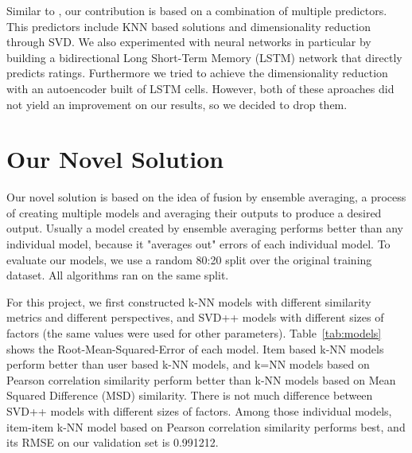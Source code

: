 \documentclass[10pt,conference,compsocconf]{IEEEtran}
\newcommand{\rtab}[1]{Table~\ref{tab:#1}}
\begin{document}
Similar to \cite{paterek}, our contribution is based on a combination of multiple predictors. This predictors include KNN based solutions and dimensionality reduction through SVD. We also experimented with neural networks in particular by building a bidirectional Long Short-Term Memory (LSTM) network that directly predicts ratings. Furthermore we tried to achieve the dimensionality reduction with an autoencoder built of LSTM cells. However, both of these aproaches did not yield an improvement on our results, so we decided to drop them.

\section{Our Novel Solution}
Our novel solution is based on the idea of fusion by ensemble averaging, a process of creating multiple models and averaging their outputs to produce a desired output\cite{ariel}. Usually a model created by ensemble averaging performs better than any individual model, because it "averages out" errors of each individual model. To evaluate our models, we use a random 80:20 split over the original training dataset. All algorithms ran on the same split. 

For this project, we first constructed k-NN models with different similarity metrics and different perspectives, and SVD++ models with different sizes of factors (the same values were used for other parameters). \rtab{models} shows the Root-Mean-Squared-Error of each model. Item based k-NN models perform better than user based k-NN models, and k=NN models based on Pearson correlation similarity perform better than k-NN models based on Mean Squared Difference (MSD) similarity. There is not much difference between SVD++ models with different sizes of factors. Among those individual models, item-item k-NN model based on Pearson correlation similarity performs best, and its RMSE on our validation set is 0.991212.
\end{document}

